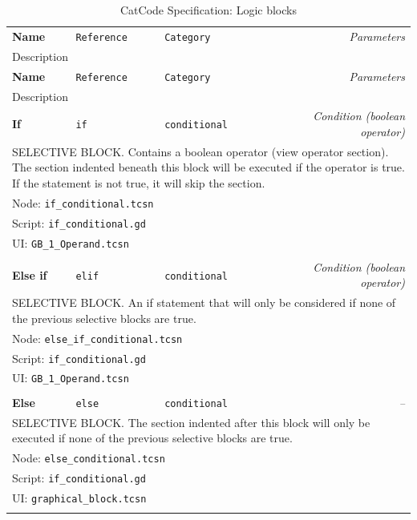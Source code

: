\begin{center}
  \begin{longtable}{lllr}
    \caption{CatCode Specification: Logic blocks} \label{tab:catCodeSpec/logic} \\
    \toprule
    \textbf{Name}
    & \texttt{Reference}
    & \texttt{Category}
    & \textit{Parameters} \\
    \multicolumn{4}{l}{
        Description
    }
    \\\midrule
    \endfirsthead
    \toprule
    \textbf{Name}
    & \texttt{Reference}
    & \texttt{Category}
    & \textit{Parameters} \\
    \multicolumn{4}{l}{
        Description
    }
    \\\midrule
    \endhead
    \textbf{If}
    & \texttt{if}
    & \texttt{conditional}
    & \textit{Condition (boolean operator)}
    \\
    \multicolumn{4}{p{0.98\linewidth}}{
        SELECTIVE BLOCK.
        Contains a boolean operator (view operator section).
        The section indented beneath this block will be executed if the operator is true.
        If the statement is not true, it will skip the section.
    }
    \\ \multicolumn{4}{l}{Node: \texttt{if\_conditional.tcsn}}
    \\ \multicolumn{4}{l}{Script: \texttt{if\_conditional.gd}}
    \\ \multicolumn{4}{l}{UI: \texttt{GB\_1\_Operand.tcsn}}
    \\ \\
    
    \textbf{Else if}
    & \texttt{elif}
    & \texttt{conditional}
    & \textit{Condition (boolean operator)}
    \\
    \multicolumn{4}{p{0.98\linewidth}}{
        SELECTIVE BLOCK.
        An if statement that will only be considered if none of the previous selective blocks are true.
    }
    \\ \multicolumn{4}{l}{Node: \texttt{else\_if\_conditional.tcsn}}
    \\ \multicolumn{4}{l}{Script: \texttt{if\_conditional.gd}}
    \\ \multicolumn{4}{l}{UI: \texttt{GB\_1\_Operand.tcsn}}
    \\ \\
    
    \textbf{Else}
    & \texttt{else}
    & \texttt{conditional}
    & \textit{--}
    \\
    \multicolumn{4}{p{0.98\linewidth}}{
        SELECTIVE BLOCK.
        The section indented after this block will only be executed if none of the previous selective blocks are true.
    }
    \\ \multicolumn{4}{l}{Node: \texttt{else\_conditional.tcsn}}
    \\ \multicolumn{4}{l}{Script: \texttt{if\_conditional.gd}}
    \\ \multicolumn{4}{l}{UI: \texttt{graphical\_block.tcsn}}
    \\ \\
    

\end{longtable}
\end{center}
